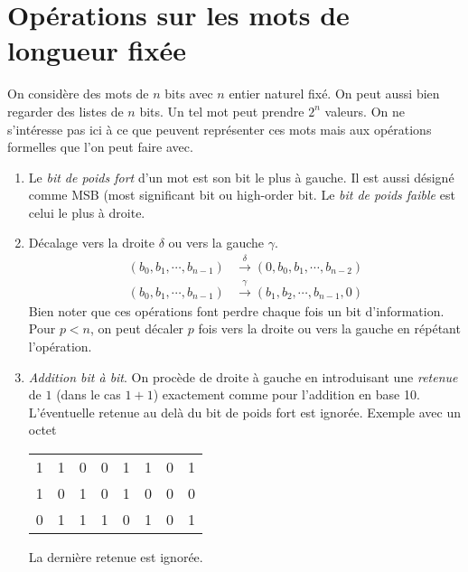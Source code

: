 \section{Opérations sur les mots de longueur fixée}
On considère des mots de $n$ bits avec $n$ entier naturel fixé. On peut aussi bien regarder des listes de $n$ bits. Un tel mot peut prendre $2^n$ valeurs. On ne s'intéresse pas ici à ce que peuvent représenter ces mots mais aux opérations formelles que l'on peut faire avec.
\begin{enumerate}
  \item Le \emph{bit de poids fort} d'un mot est son bit le plus à gauche. Il est aussi désigné comme MSB (most significant bit ou  high-order bit. Le \emph{bit de poids faible} est celui le plus à droite.
  \item Décalage vers la droite $\delta$ ou vers la gauche $\gamma$.
  \begin{align*}
    (b_0,b_1,\cdots,b_{n-1}) &\xrightarrow{\delta} (0, b_0,b_1,\cdots,b_{n-2}) \\
    (b_0,b_1,\cdots,b_{n-1}) &\xrightarrow{\gamma} (b_1,b_2,\cdots,b_{n-1}, 0)
  \end{align*}
Bien noter que ces opérations font perdre chaque fois un bit d'information. Pour $p<n$, on peut décaler $p$ fois vers la droite ou vers la gauche en répétant l'opération.
  \item \emph{Addition bit à bit}.\newline
  On procède de droite à gauche en introduisant une \emph{retenue} de $1$ (dans le cas $1+1$) exactement comme pour l'addition en base 10. L'éventuelle retenue au delà du bit de poids fort est ignorée.\newline
  Exemple avec un octet
  \begin{center}
  \begin{tabular}{cccccccc}
    1 & 1 & 0 & 0 & 1 & 1 & 0 & 1 \\ 
    1 & 0 & 1 & 0 & 1 & 0 & 0 & 0 \\ \hline
    0 & 1 & 1 & 1 & 0 & 1 & 0 & 1 \\ 
  \end{tabular}    
  \end{center}
La dernière retenue est ignorée. 


\end{enumerate}
